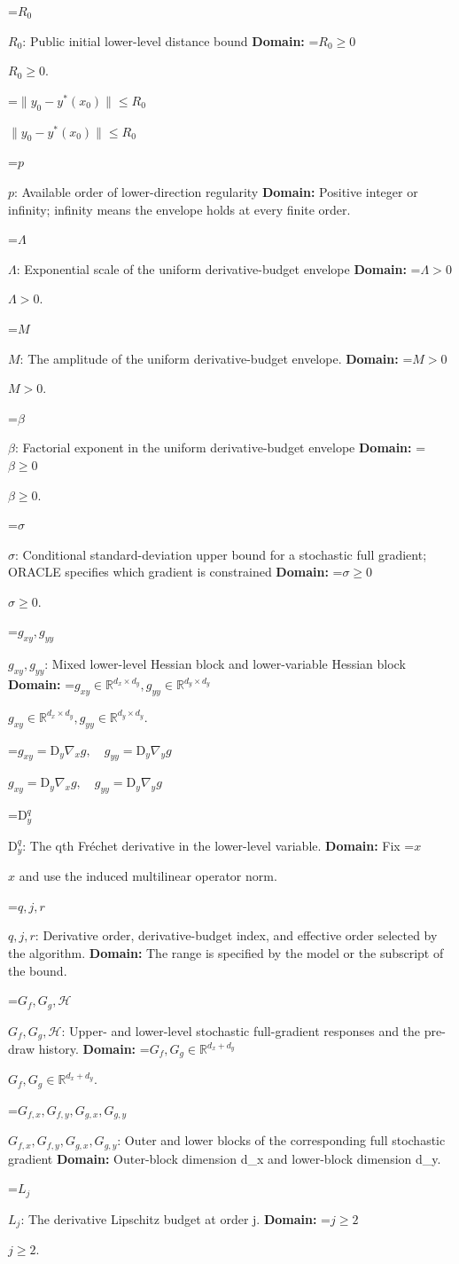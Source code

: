 \documentclass[10pt,a4paper]{article}
\newcommand{\AtlasMath}[1]{\par\begingroup\centering\setbox0=\hbox{$\displaystyle #1$}\ifdim\wd0>1.4\linewidth\typeout{ATLAS WIDE FORMULA: \the\wd0}\fi\ifdim\wd0>\linewidth\resizebox{\linewidth}{!}{\box0}\else\box0\fi\par\endgroup}
\newcommand{\AtlasInlineMath}[1]{\begingroup\setbox0=\hbox{$#1$}\ifdim\wd0>.4\linewidth\endgroup\AtlasMath{#1}\else\endgroup$#1$\fi}
\begin{document}
\AtlasInlineMath{R_0}: Public initial lower-level distance bound \textbf{Domain:} \AtlasInlineMath{R_0\ge0}.

\AtlasInlineMath{\|y_0-y^*(x_0)\|\le R_0}

\AtlasInlineMath{p}: Available order of lower-direction regularity \textbf{Domain:} Positive integer or infinity; infinity means the envelope holds at every finite order.

\AtlasInlineMath{\Lambda}: Exponential scale of the uniform derivative-budget envelope \textbf{Domain:} \AtlasInlineMath{\Lambda>0}.

\AtlasInlineMath{M}: The amplitude of the uniform derivative-budget envelope. \textbf{Domain:} \AtlasInlineMath{M>0}.

\AtlasInlineMath{\beta}: Factorial exponent in the uniform derivative-budget envelope \textbf{Domain:} \AtlasInlineMath{\beta\ge0}.

\AtlasInlineMath{\sigma}: Conditional standard-deviation upper bound for a stochastic full gradient; ORACLE specifies which gradient is constrained \textbf{Domain:} \AtlasInlineMath{\sigma\ge0}.

\AtlasInlineMath{g_{xy},g_{yy}}: Mixed lower-level Hessian block and lower-variable Hessian block \textbf{Domain:} \AtlasInlineMath{g_{xy}\in\mathbb R^{d_x\times d_y},g_{yy}\in\mathbb R^{d_y\times d_y}}.

\AtlasInlineMath{g_{xy}=\mathrm D_y\nabla_xg,\quad g_{yy}=\mathrm D_y\nabla_yg}

\AtlasInlineMath{\mathrm D_y^q}: The qth Fréchet derivative in the lower-level variable. \textbf{Domain:} Fix \AtlasInlineMath{x} and use the induced multilinear operator norm.

\AtlasInlineMath{q,j,r}: Derivative order, derivative-budget index, and effective order selected by the algorithm. \textbf{Domain:} The range is specified by the model or the subscript of the bound.

\AtlasInlineMath{G_f,G_g,\mathcal H}: Upper- and lower-level stochastic full-gradient responses and the pre-draw history. \textbf{Domain:} \AtlasInlineMath{G_f,G_g\in\mathbb R^{d_x+d_y}}.

\AtlasInlineMath{G_{f,x},G_{f,y},G_{g,x},G_{g,y}}: Outer and lower blocks of the corresponding full stochastic gradient \textbf{Domain:} Outer-block dimension d\_x and lower-block dimension d\_y.

\AtlasInlineMath{L_j}: The derivative Lipschitz budget at order j. \textbf{Domain:} \AtlasInlineMath{j\ge2}.
\end{document}
